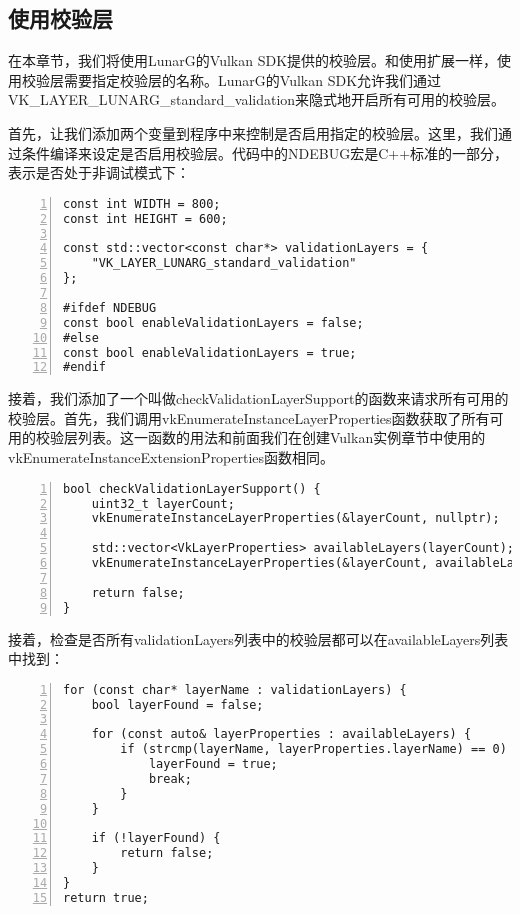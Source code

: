 \documentclass{ctexart}
\begin{document}
\subsection{使用校验层}

在本章节，我们将使用LunarG的Vulkan SDK提供的校验层。和使用扩展一样，使用校验层需要指定校验层的名称。LunarG的Vulkan SDK允许我们通过VK\_LAYER\_LUNARG\_standard\_validation来隐式地开启所有可用的校验层。

首先，让我们添加两个变量到程序中来控制是否启用指定的校验层。这里，我们通过条件编译来设定是否启用校验层。代码中的NDEBUG宏是C++标准的一部分，表示是否处于非调试模式下：

\begin{lstlisting}[language={[ANSI]C},keywordstyle=\color{blue!70},commentstyle=\color{red!50!green!50!blue!50},frame=shadowbox, rulesepcolor=\color{red!20!green!20!blue!20},basicstyle=\small,numbers=left, numberstyle=\tiny,breaklines=true]
const int WIDTH = 800;
const int HEIGHT = 600;

const std::vector<const char*> validationLayers = {
	"VK_LAYER_LUNARG_standard_validation"
};

#ifdef NDEBUG
const bool enableValidationLayers = false;
#else
const bool enableValidationLayers = true;
#endif
\end{lstlisting}

接着，我们添加了一个叫做checkValidationLayerSupport的函数来请求所有可用的校验层。首先，我们调用vkEnumerateInstanceLayerProperties函数获取了所有可用的校验层列表。这一函数的用法和前面我们在创建Vulkan实例章节中使用的vkEnumerateInstanceExtensionProperties函数相同。

\begin{lstlisting}[language={[ANSI]C},keywordstyle=\color{blue!70},commentstyle=\color{red!50!green!50!blue!50},frame=shadowbox, rulesepcolor=\color{red!20!green!20!blue!20},basicstyle=\small,numbers=left, numberstyle=\tiny,breaklines=true]
bool checkValidationLayerSupport() {
	uint32_t layerCount;
	vkEnumerateInstanceLayerProperties(&layerCount, nullptr);

	std::vector<VkLayerProperties> availableLayers(layerCount);
	vkEnumerateInstanceLayerProperties(&layerCount, availableLayers.data());

	return false;
}
\end{lstlisting}

接着，检查是否所有validationLayers列表中的校验层都可以在availableLayers列表中找到：

\begin{lstlisting}[language={[ANSI]C},keywordstyle=\color{blue!70},commentstyle=\color{red!50!green!50!blue!50},frame=shadowbox, rulesepcolor=\color{red!20!green!20!blue!20},basicstyle=\small,numbers=left, numberstyle=\tiny,breaklines=true]
for (const char* layerName : validationLayers) {
	bool layerFound = false;

	for (const auto& layerProperties : availableLayers) {
		if (strcmp(layerName, layerProperties.layerName) == 0) {
			layerFound = true;
			break;
		}
	}

	if (!layerFound) {
		return false;
	}
}
return true;
\end{lstlisting}
\end{document}
